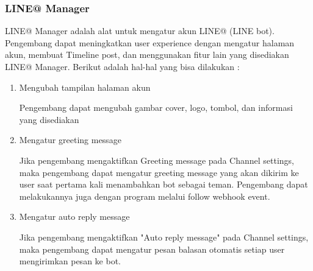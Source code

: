 \subsubsection{LINE@ Manager}
LINE@ Manager adalah alat untuk mengatur akun LINE@ (LINE bot). Pengembang dapat meningkatkan user experience dengan mengatur halaman akun, membuat Timeline post, dan menggunakan fitur lain yang disediakan LINE@ Manager. Berikut adalah hal-hal yang bisa dilakukan :
\begin{enumerate}
\item Mengubah tampilan halaman akun

Pengembang dapat mengubah gambar cover, logo, tombol, dan informasi yang disediakan

\item Mengatur greeting message

Jika pengembang mengaktifkan Greeting message pada Channel settings, maka pengembang dapat mengatur greeting message yang akan dikirim ke user saat pertama kali menambahkan bot sebagai teman. Pengembang dapat melakukannya juga dengan program melalui follow webhook event.

\item Mengatur auto reply message

Jika pengembang mengaktifkan "Auto reply message" pada Channel settings, maka pengembang dapat mengatur pesan balasan otomatis setiap user mengirimkan pesan ke bot.
\end{enumerate}